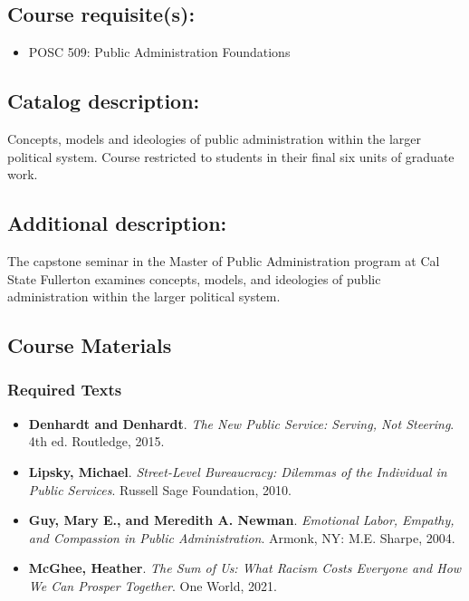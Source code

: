 \documentclass[12pt]{article}     %
\begin{document}
	\subsection {Course requisite(s):}
		\begin{itemize}
			\item POSC 509: Public Administration Foundations
		\end{itemize}

	\subsection*{Catalog description:} 
		Concepts, models and ideologies of public administration within the larger political system. Course restricted to students in their final six units of graduate work.

	\subsection*{Additional description:}
		The capstone seminar in the Master of Public Administration program at Cal State Fullerton examines concepts, models, and ideologies of public administration within the larger political system.


	\subsection*{Course Materials}
	\subsubsection*{Required Texts}
    \begin{itemize}
        \item \textbf{Denhardt and Denhardt}. \textit{The New Public Service: Serving, Not Steering}. 4th ed. Routledge, 2015.
        \item \textbf{Lipsky, Michael}. \textit{Street-Level Bureaucracy: Dilemmas of the Individual in Public Services}. Russell Sage Foundation, 2010.
        \item \textbf{Guy, Mary E., and Meredith A. Newman}. \textit{Emotional Labor, Empathy, and Compassion in Public Administration}. Armonk, NY: M.E. Sharpe, 2004.
        \item \textbf{McGhee, Heather}. \textit{The Sum of Us: What Racism Costs Everyone and How We Can Prosper Together}. One World, 2021.
    \end{itemize}
\end{document}
